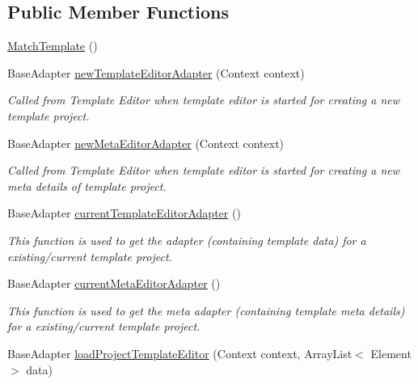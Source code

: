 \subsection*{Public Member Functions}
\begin{DoxyCompactItemize}
\item 
\hyperlink{classorg_1_1buildmlearn_1_1toolkit_1_1templates_1_1MatchTemplate_a70ee773aa46fdc3dd153884cd92f8e4d}{Match\+Template} ()
\item 
Base\+Adapter \hyperlink{classorg_1_1buildmlearn_1_1toolkit_1_1templates_1_1MatchTemplate_a3b7414157c2c750b00d2c13771a7fcbc}{new\+Template\+Editor\+Adapter} (Context context)
\begin{DoxyCompactList}\small\item\em Called from Template Editor when template editor is started for creating a new template project. \end{DoxyCompactList}\item 
Base\+Adapter \hyperlink{classorg_1_1buildmlearn_1_1toolkit_1_1templates_1_1MatchTemplate_a9a07a4fd12dc758e34148262d809df82}{new\+Meta\+Editor\+Adapter} (Context context)
\begin{DoxyCompactList}\small\item\em Called from Template Editor when template editor is started for creating a new meta details of template project. \end{DoxyCompactList}\item 
Base\+Adapter \hyperlink{classorg_1_1buildmlearn_1_1toolkit_1_1templates_1_1MatchTemplate_a1445573720292a426ed0457d65bfe06a}{current\+Template\+Editor\+Adapter} ()
\begin{DoxyCompactList}\small\item\em This function is used to get the adapter (containing template data) for a existing/current template project. \end{DoxyCompactList}\item 
Base\+Adapter \hyperlink{classorg_1_1buildmlearn_1_1toolkit_1_1templates_1_1MatchTemplate_a6289558776a2c935e06142bbb8512286}{current\+Meta\+Editor\+Adapter} ()
\begin{DoxyCompactList}\small\item\em This function is used to get the meta adapter (containing template meta details) for a existing/current template project. \end{DoxyCompactList}\item 
Base\+Adapter \hyperlink{classorg_1_1buildmlearn_1_1toolkit_1_1templates_1_1MatchTemplate_aa33a96e6a62fb0d840f4912d88097396}{load\+Project\+Template\+Editor} (Context context, Array\+List$<$ Element $>$ data)

\end{DoxyCompactItemize}

